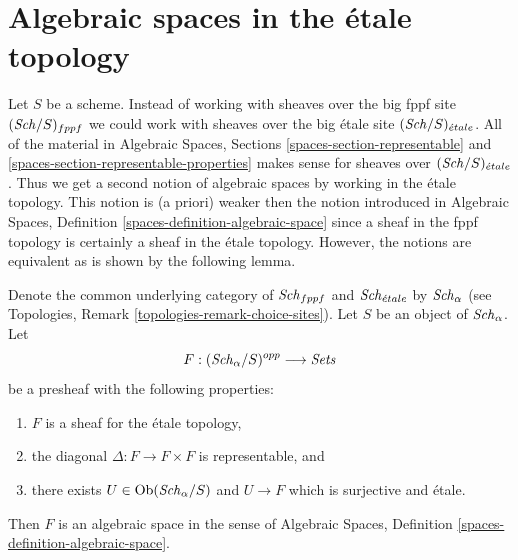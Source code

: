 \section{Algebraic spaces in the \'etale topology}
\label{section-spaces-etale}

\noindent
Let $S$ be a scheme. Instead of working with sheaves over
the big fppf site $(\mathit{Sch}/S)_{fppf}$ we could work with sheaves
over the big \'etale site $(\mathit{Sch}/S)_{\acute{e}tale}$. All of the material in
Algebraic Spaces, Sections \ref{spaces-section-representable} and
\ref{spaces-section-representable-properties}
makes sense for sheaves over $(\mathit{Sch}/S)_{\acute{e}tale}$.
Thus we get a second notion of algebraic spaces by working in the
\'etale topology. This notion is (a priori) weaker then the notion introduced
in Algebraic Spaces, Definition \ref{spaces-definition-algebraic-space}
since a sheaf in the fppf topology is certainly a sheaf in the \'etale
topology. However, the notions are equivalent as is shown by the following
lemma.

\begin{lemma}
\label{lemma-spaces-etale}
Denote the common underlying category of $\mathit{Sch}_{fppf}$ and $\mathit{Sch}_{\acute{e}tale}$ by
$\mathit{Sch}_\alpha$ (see Topologies, Remark \ref{topologies-remark-choice-sites}).
Let $S$ be an object of $\mathit{Sch}_\alpha$. Let
$$
F : (\mathit{Sch}_\alpha/S)^{opp} \longrightarrow \textit{Sets}
$$
be a presheaf with the following properties:
\begin{enumerate}
\item $F$ is a sheaf for the \'etale topology,
\item the diagonal $\Delta : F \to F \times F$ is representable, and
\item there exists $U \in \mathop{\mathrm{Ob}}\nolimits(\mathit{Sch}_\alpha/S)$
and $U \to F$ which is surjective and \'etale.
\end{enumerate}
Then $F$ is an algebraic space in the sense of
Algebraic Spaces, Definition \ref{spaces-definition-algebraic-space}.
\end{lemma}

